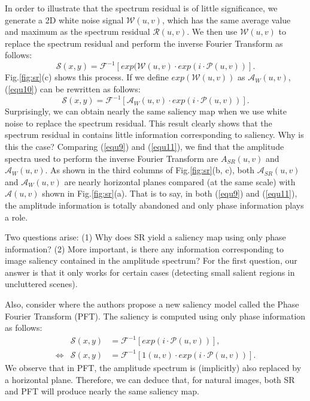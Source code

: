 \documentclass[10pt,journal,cspaper,compsoc]{IEEEtran}
\begin{document}
In order to illustrate that the spectrum residual is of little significance, we generate a 2D white noise signal ${\mathcal W}(u,v)$, which has the same average value and maximum as the spectrum residual ${\mathcal R}(u,v)$. We then use ${\mathcal W}(u,v)$ to replace the spectrum residual and perform the inverse Fourier Transform as follows:
\begin{equation}
{\mathcal S}(x,y)={\mathcal F}^{-1}[exp({\mathcal W}(u,v)\cdot exp(i\cdot{\mathcal P}(u,v))].  \label {equ10}
\end{equation}
Fig.\ref{fig:sr}(c) shows this process. If we define $exp({\mathcal W}(u,v))$ as ${\mathcal A}_{W}(u,v)$, (\ref{equ10}) can be rewritten as follows:
\begin{equation}
{\mathcal S}(x,y)={\mathcal F}^{-1}[{\mathcal A}_{W}(u,v)\cdot exp(i\cdot{\mathcal P}(u,v))].  \label {equ11}
\end {equation}
Surprisingly, we can obtain nearly the same saliency map when we use white noise to replace the spectrum residual. This result clearly shows that the spectrum residual in \cite{hou2007saliency} contains little information corresponding to saliency. Why is this the case? Comparing (\ref{equ9}) and (\ref{equ11}), we find that the amplitude spectra used to perform the inverse Fourier Transform are $A_{SR}(u,v)$ and ${\mathcal A}_{W}(u,v)$. As shown in the third columns of Fig.{\ref{fig:sr}}(b, c), both ${\mathcal A}_{SR}(u,v)$ and ${\mathcal A}_{W}(u,v)$ are nearly horizontal planes compared  (at the same scale) with ${\mathcal A}(u,v)$ shown in Fig.\ref{fig:sr}(a). That is to say, in both (\ref{equ9}) and (\ref{equ11}), the amplitude information is totally abandoned and only phase information plays a role.

Two questions arise:
(1) Why does SR yield a saliency map using only phase information?
(2) More important, is there any information corresponding to image saliency contained in the amplitude spectrum?
For the first question, our answer is that it only works for certain cases (detecting small salient regions in uncluttered scenes).

Also, consider \cite{guo2008spatio, guo2010multiresolution} where the authors propose a new saliency model called the Phase Fourier Transform (PFT). The saliency is computed using only phase information as follows:
\begin{eqnarray}
&{\mathcal S}(x,y)&={\mathcal F}^{-1}[exp(i\cdot{\mathcal P}(u,v))],  \label {equ12} \\
\Leftrightarrow&{\mathcal S}(x,y)&={\mathcal F}^{-1}[1(u,v)\cdot exp(i\cdot{\mathcal P}(u,v))].   \label {equ14}
\end{eqnarray}
We observe that in PFT, the amplitude spectrum is (implicitly) also replaced by a horizontal plane. Therefore, we can deduce that, for natural images, both SR and PFT will produce nearly the same saliency map.
\end{document}

